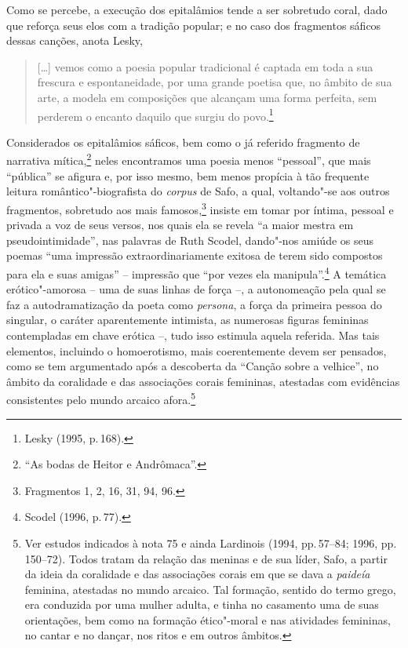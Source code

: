 Como se percebe, a execução dos epitalâmios tende a ser sobretudo coral, dado
que reforça seus elos com a tradição popular; e no caso dos fragmentos sáficos
dessas canções, anota Lesky, 

\begin{quote}
{[}\ldots{}{]} vemos como a poesia popular
tradicional é captada em toda a sua frescura e espontaneidade, por uma grande
poetisa que, no âmbito de sua arte, a modela em composições que alcançam uma
forma perfeita, sem perderem o encanto daquilo que surgiu do povo.\footnote{ Lesky (1995, p.\,168).}
\end{quote}

Considerados os epitalâmios sáficos, bem como o já referido fragmento de
narrativa mítica,\footnote{``As bodas de Heitor e Andrômaca''.} neles
encontramos uma poesia menos “pessoal”, que mais ``pública'' se afigura e, por isso mesmo, bem menos propícia à tão frequente leitura romântico"-biografista do \textit{corpus} de
Safo, a qual, voltando"-se aos outros fragmentos, sobretudo aos mais famosos,\footnote{Fragmentos 1, 2, 16, 31, 94, 96.} insiste em tomar por íntima, pessoal e privada a voz de seus versos, nos quais ela se revela “a maior mestra em pseudointimidade”, nas palavras de Ruth Scodel, dando"-nos amiúde os seus poemas “uma impressão extraordinariamente exitosa de terem sido compostos para ela e suas amigas” -- impressão que “por vezes ela manipula”.\footnote{Scodel (1996, p.\,77).}
A temática
erótico"-amorosa -- uma de suas linhas de força --, a autonomeação
pela qual se faz a autodramatização da poeta como \textit{persona}, a força da primeira pessoa do singular, o caráter
aparentemente intimista, as numerosas figuras
femininas contempladas em chave erótica --, tudo isso estimula aquela referida.
Mas tais elementos, incluindo o homoerotismo, mais coerentemente devem ser pensados, como se tem argumentado após a descoberta da ``Canção sobre a velhice'', no âmbito da coralidade e das associações corais femininas, atestadas com evidências consistentes pelo mundo arcaico afora.\footnote{Ver estudos indicados à nota 75 e ainda Lardinois (1994, pp.\,57--84; 1996, pp.\,150--72). Todos tratam da relação das meninas e de sua líder, Safo, a partir da ideia da coralidade e das associações corais em que se dava a \textit{paideía} feminina, atestadas no mundo arcaico. Tal formação, sentido do termo grego, era conduzida por uma mulher adulta, e tinha no casamento uma de suas orientações, bem como na formação ético"-moral e nas atividades femininas, no cantar e no dançar, nos ritos e em outros âmbitos.} 

